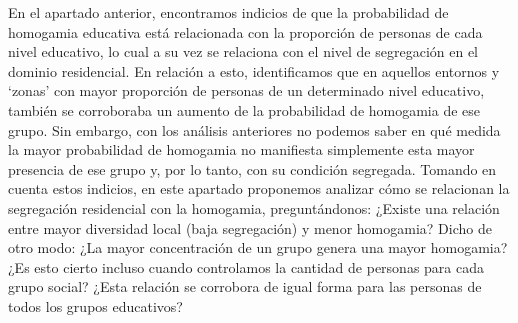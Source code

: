 \documentclass[
  spanish,
  a4paper,%
  chapterprefix=true,%
  DIV=calc,%
  twoside]{scrbook}%
\begin{document}
En el apartado anterior, encontramos indicios de que la probabilidad de
homogamia educativa está relacionada con la proporción de personas de
cada nivel educativo, lo cual a su vez se relaciona con el nivel de
segregación en el dominio residencial. En relación a esto, identificamos
que en aquellos entornos y `zonas' con mayor proporción de personas de
un determinado nivel educativo, también se corroboraba un aumento de la
probabilidad de homogamia de ese grupo. Sin embargo, con los análisis
anteriores no podemos saber en qué medida la mayor probabilidad de
homogamia no manifiesta simplemente esta mayor presencia de ese grupo y,
por lo tanto, con su condición segregada. Tomando en cuenta estos
indicios, en este apartado proponemos analizar cómo se relacionan la
segregación residencial con la homogamia, preguntándonos: ¿Existe una
relación entre mayor diversidad local (baja segregación) y menor
homogamia? Dicho de otro modo: ¿La mayor concentración de un grupo
genera una mayor homogamia? ¿Es esto cierto incluso cuando controlamos
la cantidad de personas para cada grupo social? ¿Esta relación se
corrobora de igual forma para las personas de todos los grupos
educativos?
\end{document}
